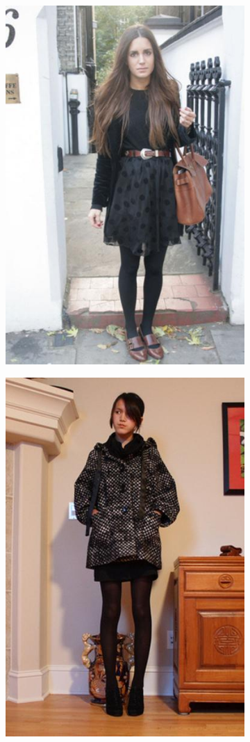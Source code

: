 \documentclass[12pt]{report}
\begin{document}
\begin{figure}
\centering
  \begin{subfigure}[b]{0.2\textwidth}
  \centering
    \includegraphics[scale=0.2]{images/paper1.jpg}
  \end{subfigure}
  \begin{subfigure}[b]{0.2\textwidth}
  \centering
    \includegraphics[scale=0.2]{images/paper2.jpg}
  \end{subfigure}
  

\end{figure}
\end{document}

